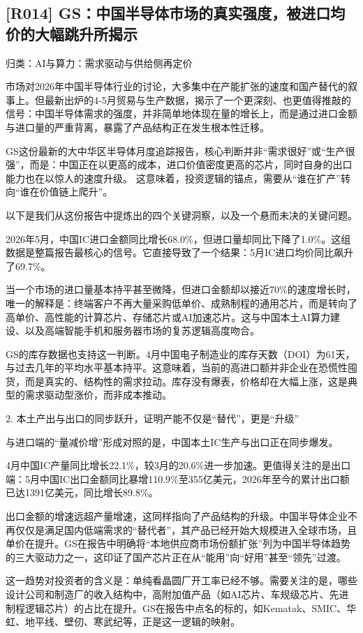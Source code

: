 \documentclass[11pt]{ctexart}
\begin{document}
\subsection{[R014] GS：中国半导体市场的真实强度，被进口均价的大幅跳升所揭示}
{\small\color{refgray}归类：AI与算力：需求驱动与供给侧再定价}

市场对2026年中国半导体行业的讨论，大多集中在产能扩张的速度和国产替代的叙事上。但最新出炉的4-5月贸易与生产数据，揭示了一个更深刻、也更值得推敲的信号：中国半导体需求的强度，并非简单地体现在量的增长上，而是通过进口金额与进口量的严重背离，暴露了产品结构正在发生根本性迁移。

GS这份最新的大中华区半导体月度追踪报告，核心判断并非“需求很好”或“生产很强”，而是：中国正在以更高的成本，进口价值密度更高的芯片，同时自身的出口能力也在以惊人的速度升级。 这意味着，投资逻辑的锚点，需要从“谁在扩产”转向“谁在价值链上爬升”。

以下是我们从这份报告中提炼出的四个关键洞察，以及一个悬而未决的关键问题。

2026年5月，中国IC进口金额同比增长68.0\%，但进口量却同比下降了1.0\%。这组数据是整篇报告最核心的信号。它直接导致了一个结果：5月IC进口均价同比飙升了69.7\%。

当一个市场的进口量基本持平甚至微降，但进口金额却以接近70\%的速度增长时，唯一的解释是：终端客户不再大量采购低单价、成熟制程的通用芯片，而是转向了高单价、高性能的计算芯片、存储芯片或AI加速芯片。这与中国本土AI算力建设、以及高端智能手机和服务器市场的复苏逻辑高度吻合。

GS的库存数据也支持这一判断。4月中国电子制造业的库存天数（DOI）为61天，与过去几年的平均水平基本持平。这意味着，当前的高进口额并非企业在恐慌性囤货，而是真实的、结构性的需求拉动。库存没有爆表，价格却在大幅上涨，这是典型的需求驱动型涨价，而非成本推动。

2. 本土产出与出口的同步跃升，证明产能不仅是“替代”，更是“升级”

与进口端的“量减价增”形成对照的是，中国本土IC生产与出口正在同步爆发。

4月中国IC产量同比增长22.1\%，较3月的20.6\%进一步加速。更值得关注的是出口端：5月中国IC出口金额同比暴增110.9\%至355亿美元，2026年至今的累计出口额已达1391亿美元，同比增长89.8\%。

出口金额的增速远超产量增速，这同样指向了产品结构的升级。中国半导体企业不再仅仅是满足国内低端需求的“替代者”，其产品已经开始大规模进入全球市场，且单价在提升。GS在报告中明确将“本地供应商市场份额扩张”列为中国半导体趋势的三大驱动力之一，这印证了国产芯片正在从“能用”向“好用”甚至“领先”过渡。

这一趋势对投资者的含义是：单纯看晶圆厂开工率已经不够。需要关注的是，哪些设计公司和制造厂的收入结构中，高附加值产品（如AI芯片、车规级芯片、先进制程逻辑芯片）的占比在提升。GS在报告中点名的标的，如Kematak、SMIC、华虹、地平线、壁仞、寒武纪等，正是这一逻辑的映射。
\end{document}
